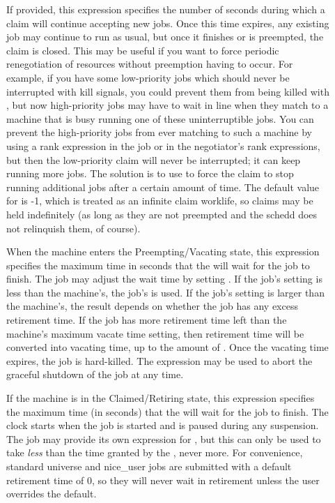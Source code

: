 \begin{description}
\item[] If provided, this expression specifies
the number of seconds during which a claim will continue accepting new
jobs.  Once this time expires, any existing job may continue to run as
usual, but once it finishes or is preempted, the claim is closed.
This may be useful if you want to force periodic renegotiation of
resources without preemption having to occur.  For example, if you
have some low-priority jobs which should never be interrupted with
kill signals, you could prevent them from being killed with
, but now high-priority jobs may have to
wait in line when they match to a machine that is busy running one of
these uninterruptible jobs.  You can prevent the high-priority jobs
from ever matching to such a machine by using a rank expression in the
job or in the negotiator's rank expressions, but then the low-priority
claim will never be interrupted; it can keep running more jobs.  The
solution is to use  to force the claim to stop
running additional jobs after a certain amount of time.
The default value for  is -1, which is treated
as an infinite claim worklife, so claims may be held indefinitely (as
long as they are not preempted and the schedd does not relinquish
them, of course).

\item[] When the machine enters the
Preempting/Vacating state, this expression specifies the maximum
time in seconds that the  will wait for the job to
finish.  The job may adjust the wait time by setting
.  If the job's setting is less than the
machine's, the job's is used.  If the job's setting is larger than
the machine's, the result depends on whether the job has any excess
retirement time.  If the job has more retirement time left than the
machine's maximum vacate time setting, then retirement time will be
converted into vacating time, up to the amount of
.  Once the vacating time expires, the
job is hard-killed.  The  expression may be used
to abort the graceful shutdown of the job at any time.

\item[] If the machine is in the
Claimed/Retiring state, this expression specifies the maximum time (in
seconds) that the  will wait for the job to finish.
The clock starts when the
job is started and is paused during any suspension.  The job may
provide its own expression for , but this
can only be used to take \emph{less} than the time granted by the
, never more.  For convenience, standard universe and
nice\_user jobs are submitted with a default retirement time of 0, so
they will never wait in retirement unless the user overrides the
default.


\end{description}
